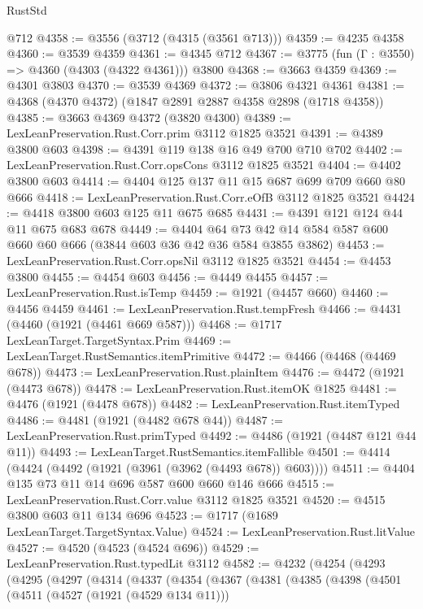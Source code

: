 \begin{lexlean}{RustStd}
\begin{coremodule}
    @712
@4358 := @3556 (@3712 (@4315 (@3561 @713)))
@4359 := @4235 @4358
@4360 := @3539 @4359
@4361 := @4345 @712
@4367 := @3775 (fun (Γ : @3550) => @4360 (@4303 (@4322 @4361))) @3800
@4368 := @3663 @4359
@4369 := @4301 @3803
@4370 := @3539 @4369
@4372 := @3806 @4321 @4361
@4381 := @4368 (@4370 @4372) (@1847 @2891 @2887 @4358 @2898 (@1718 @4358))
@4385 := @3663 @4369 @4372 (@3820 @4300)
@4389 := LexLeanPreservation.Rust.Corr.prim @3112 @1825 @3521
@4391 := @4389 @3800 @603
@4398 := @4391 @119 @138 @16 @49 @700 @710 @702
@4402 := LexLeanPreservation.Rust.Corr.opsCons @3112 @1825 @3521
@4404 := @4402 @3800 @603
@4414 := @4404 @125 @137 @11 @15 @687 @699 @709 @660 @80 @666
@4418 := LexLeanPreservation.Rust.Corr.eOfB @3112 @1825 @3521
@4424 := @4418 @3800 @603 @125 @11 @675 @685
@4431 := @4391 @121 @124 @44 @11 @675 @683 @678
@4449 := @4404
    @64
    @73
    @42
    @14
    @584
    @587
    @600
    @660
    @60
    @666
    (@3844 @603 @36 @42 @36 @584 @3855 @3862)
@4453 := LexLeanPreservation.Rust.Corr.opsNil @3112 @1825 @3521
@4454 := @4453 @3800
@4455 := @4454 @603
@4456 := @4449 @4455
@4457 := LexLeanPreservation.Rust.isTemp
@4459 := @1921 (@4457 @660)
@4460 := @4456 @4459
@4461 := LexLeanPreservation.Rust.tempFresh
@4466 := @4431 (@4460 (@1921 (@4461 @669 @587)))
@4468 := @1717 LexLeanTarget.TargetSyntax.Prim
@4469 := LexLeanTarget.RustSemantics.itemPrimitive
@4472 := @4466 (@4468 (@4469 @678))
@4473 := LexLeanPreservation.Rust.plainItem
@4476 := @4472 (@1921 (@4473 @678))
@4478 := LexLeanPreservation.Rust.itemOK @1825
@4481 := @4476 (@1921 (@4478 @678))
@4482 := LexLeanPreservation.Rust.itemTyped
@4486 := @4481 (@1921 (@4482 @678 @44))
@4487 := LexLeanPreservation.Rust.primTyped
@4492 := @4486 (@1921 (@4487 @121 @44 @11))
@4493 := LexLeanTarget.RustSemantics.itemFallible
@4501 := @4414 (@4424 (@4492 (@1921 (@3961 (@3962 (@4493 @678)) @603))))
@4511 := @4404 @135 @73 @11 @14 @696 @587 @600 @660 @146 @666
@4515 := LexLeanPreservation.Rust.Corr.value @3112 @1825 @3521
@4520 := @4515 @3800 @603 @11 @134 @696
@4523 := @1717 (@1689 LexLeanTarget.TargetSyntax.Value)
@4524 := LexLeanPreservation.Rust.litValue
@4527 := @4520 (@4523 (@4524 @696))
@4529 := LexLeanPreservation.Rust.typedLit @3112
@4582 := @4232
    (@4254
      (@4293
        (@4295
          (@4297
            (@4314
              (@4337
                (@4354
                  (@4367
                    (@4381
                      (@4385
                        (@4398
                          (@4501
                            (@4511
                              (@4527 (@1921 (@4529 @134 @11)))

\end{coremodule}
\end{lexlean}
